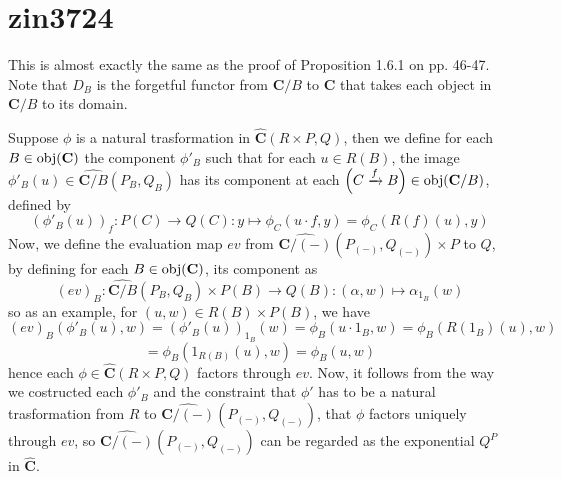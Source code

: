 \section{zin3724}
This is almost exactly the same as the proof of Proposition 1.6.1 on pp. 46-47. Note that $D_B$ is the forgetful functor from $\mathbf C/B$ to $\mathbf C$ that takes each object in $\mathbf C/B$ to its domain.

Suppose $\phi$ is a natural trasformation in $\widehat{\mathbf{C}}(R\times P,Q)$, then we define for each $B\in\operatorname{\operatorname{obj}}(\mathbf C)$ the component $\phi'_B$ such that for each $u\in R(B)$, the image $\phi'_B(u)\in\widehat{\mathbf{C}/B}(P_B,Q_B)$ has its component at each $\left(C\xrightarrow{f}B\right)\in\operatorname{\operatorname{obj}}(\mathbf C/B)$, defined by
\[(\phi'_B(u))_f:P(C)\to Q(C):y\mapsto\phi_C(u\cdot f,y)=\phi_C(R(f)(u),y)\]
Now, we define the evaluation map $ev$ from $\widehat{\mathbf{C}/(-)}(P_{(-)},Q_{(-)})\times P$ to $Q$, by defining for each $B\in\operatorname{\operatorname{obj}}(\mathbf{C})$, its component as
\[(ev)_B:\widehat{\mathbf{C}/B}(P_B,Q_B)\times P(B)\to Q(B):(\alpha,w)\mapsto\alpha_{1_B}(w)\]
so as an example, for $(u,w)\in R(B)\times P(B)$, we have
\[(ev)_B(\phi'_B(u),w)=(\phi'_B(u))_{1_B}(w)=\phi_B(u\cdot1_B,w)=\phi_B(R(1_B)(u),w)\]
\[=\phi_B(1_{R(B)}(u),w)=\phi_B(u,w)\]
hence each $\phi\in\widehat{\mathbf{C}}(R\times P,Q)$ factors through $ev$. Now, it follows from the way we costructed each $\phi'_B$ and the constraint that $\phi'$ has to be a natural trasformation from $R$ to $\widehat{\mathbf{C}/(-)}(P_{(-)},Q_{(-)})$, that $\phi$ factors uniquely through $ev$, so $\widehat{\mathbf{C}/(-)}(P_{(-)},Q_{(-)})$ can be regarded as the exponential $Q^P$ in $\widehat{\mathbf{C}}$.